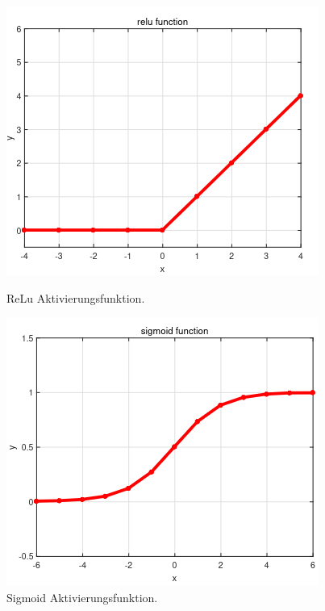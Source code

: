     \begin{figure}[h]
        \centering
        \begin{minipage}[t]{0.45\textwidth}
            \centering
            \includegraphics[width=\textwidth]{img/relu_fun.png}
            \caption{ReLu Aktivierungsfunktion.}
        \end{minipage}\hfill
        \begin{minipage}[t]{0.45\textwidth}
            \centering
            \includegraphics[width=\textwidth]{img/sigmoid_fun.png}
            \caption{Sigmoid Aktivierungsfunktion.}
        \end{minipage}
    \end{figure}

